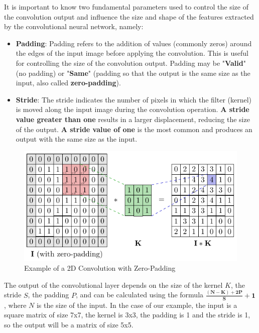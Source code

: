 It is important to know two fundamental parameters used to control the size of the convolution output and influence the size and shape of the features extracted by the convolutional neural network, namely:
\begin{itemize}
    \item \textbf{Padding}: Padding refers to the addition of values (commonly zeros) around the edges of the input image before applying the convolution. This is useful for controlling the size of the convolution output. Padding may be "\textbf{Valid}" (no padding) or "\textbf{Same}" (padding so that the output is the same size as the input, also called \textbf{zero-padding}).
    \item \textbf{Stride}: The stride indicates the number of pixels in which the filter (kernel) is moved along the input image during the convolution operation. \textbf{A stride value greater than one} results in a larger displacement, reducing the size of the output. \textbf{A stride value of one} is the most common and produces an output with the same size as the input.
\end{itemize}

\begin{figure}[!htbp]
    \centering
    \includegraphics[width=\textwidth]{tikz/chapter5 - Convolution with Padding.pdf}
    \caption{Example of a 2D Convolution with Zero-Padding}
\end{figure}

The output of the convolutional layer depends on the size of the kernel $K$, the stride $S$, the padding $P$, and can be calculated using the formula $\mathbf{\frac{(N-K)+2P}{S}+1}$, where $N$ is the size of the input. In the case of our example, the input is a square matrix of size 7x7, the kernel is 3x3, the padding is 1 and the stride is 1, so the output will be a matrix of size 5x5.

